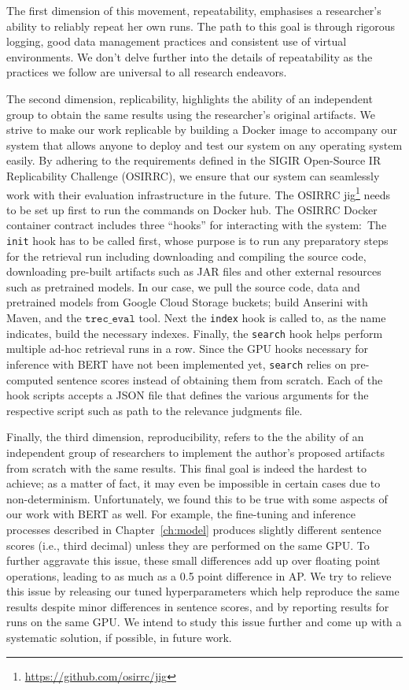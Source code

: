 The first dimension of this movement, repeatability, emphasises a researcher's ability to reliably repeat her own runs.
The path to this goal is through rigorous logging, good data management practices and consistent use of virtual environments.
We don't delve further into the details of repeatability as the practices we follow are universal to all research endeavors.

The second dimension, replicability, highlights the ability of an independent group to obtain the same results using the researcher's original artifacts.
We strive to make our work replicable by building a Docker image to accompany our system that allows anyone to deploy and test our system on any operating system easily.
By adhering to the requirements defined in the SIGIR Open-Source IR Replicability Challenge (OSIRRC), we ensure that our system can seamlessly work with their evaluation infrastructure in the future.
The OSIRRC jig\footnote{\url{https://github.com/osirrc/jig}} needs to be set up first to run the commands on Docker hub.
The OSIRRC Docker container contract includes three ``hooks'' for interacting with the system:\
The \texttt{init} hook has to be called first, whose purpose is to run any preparatory steps for the retrieval run including downloading and compiling the source code, downloading pre-built artifacts such as JAR files and other external resources such as pretrained models.
In our case, we pull the source code, data and pretrained models from Google Cloud Storage buckets; build Anserini with Maven, and the $\texttt{trec\_eval}$ tool.
Next the \texttt{index} hook is called to, as the name indicates, build the necessary indexes.
Finally, the \texttt{search} hook helps perform multiple ad-hoc retrieval runs in a row.
Since the GPU hooks necessary for inference with BERT have not been implemented yet, \texttt{search} relies on pre-computed sentence scores instead of obtaining them from scratch.
Each of the hook scripts accepts a JSON file that defines the various arguments for the respective script such as path to the relevance judgments file.

Finally, the third dimension, reproducibility, refers to the the ability of an independent group of researchers to implement the author's proposed artifacts from scratch with the same results.
This final goal is indeed the hardest to achieve; as a matter of fact, it may even be impossible in certain cases due to non-determinism.
Unfortunately, we found this to be true with some aspects of our work with BERT as well.
For example, the fine-tuning and inference processes described in Chapter~\ref{ch:model} produces slightly different sentence scores (i.e., third decimal) unless they are performed on the same GPU.
To further aggravate this issue, these small differences add up over floating point operations, leading to as much as a 0.5 point difference in AP.
We try to relieve this issue by releasing our tuned hyperparameters which help reproduce the same results despite minor differences in sentence scores, and by reporting results for runs on the same GPU.
We intend to study this issue further and come up with a systematic solution, if possible, in future work.

